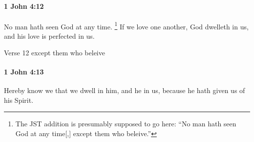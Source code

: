		\paragraph{1 John 4:12} %
			\label{1JOHN-4-12}

			No man hath seen God at any time.%
				\footnote{%
					The JST addition is presumably supposed to go here: ``No man hath seen God at any time[,] except them who beleive.''
					}
			If we love one another, God dwelleth in us, and his love is perfected in us.

			\begin{framed}
			\scriptsize
				\begin{compactdesc}
					\item[SBLG] 
					\item[NTR2] Verse 12 except them who beleive
				\end{compactdesc}
			\end{framed}

		\paragraph{1 John 4:13} %
			\label{1JOHN-4-13}

			Hereby know we that we dwell in him, and he in us, because he hath given us of his Spirit.

